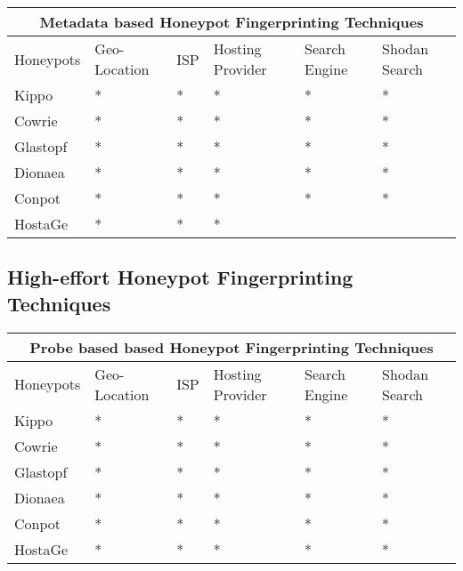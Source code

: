 \documentclass[../main.tex]{subfiles}
\begin{document}
 \begin{tabular}{ |p{1.5cm}||p{1.2cm}|p{0.4cm}|p{1.2cm}|p{1.2cm}|p{1.2cm}| }
 \hline
 \multicolumn{6}{|c|}{Metadata based Honeypot Fingerprinting Techniques} \\
 \hline
 Honeypots & Geo-Location & ISP & Hosting Provider & Search Engine & Shodan Search\\
 \hline
 Kippo   & *  &* & * & * & * \\
 Cowrie  & *  &* & * & * & * \\
 Glastopf& *  &* & * & * & * \\
 Dionaea & *  &* & * & * & * \\
 Conpot  & *  &* & * & * & * \\
 HostaGe & *  &* & * &   &   \\
 \hline
\end{tabular}




\subsection{High-effort Honeypot Fingerprinting Techniques}



\begin{tabular}{ |p{1.5cm}||p{1.2cm}|p{0.4cm}|p{1.2cm}|p{1.2cm}|p{1.2cm}| }
 \hline
 \multicolumn{6}{|c|}{Probe based based Honeypot Fingerprinting Techniques} \\
 \hline
 Honeypots & Geo-Location & ISP & Hosting Provider & Search Engine & Shodan Search\\
 \hline
 Kippo   & *  &* & * & * & * \\
 Cowrie  & *  &* & * & * & * \\
 Glastopf& *  &* & * & * & * \\
 Dionaea & *  &* & * & * & * \\
 Conpot  & *  &* & * & * & * \\
 HostaGe & *  &* & * & * & * \\
 \hline
\end{tabular}
\end{document}
